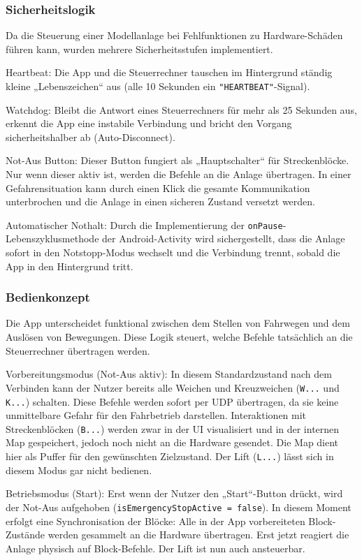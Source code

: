 \documentclass{article}
\begin{document}
\subsubsection{Sicherheitslogik}
Da die Steuerung einer Modellanlage bei Fehlfunktionen zu Hardware-Schäden führen kann, wurden mehrere Sicherheitsstufen implementiert.

Heartbeat: Die App und die Steuerrechner tauschen im Hintergrund ständig kleine „Lebenszeichen“ aus (alle 10 Sekunden ein \texttt{"HEARTBEAT"}-Signal).

Watchdog: Bleibt die Antwort eines Steuerrechners für mehr als 25 Sekunden aus, erkennt die App eine instabile Verbindung und bricht den Vorgang sicherheitshalber ab (Auto-Disconnect).

Not-Aus Button: Dieser Button fungiert als „Hauptschalter“ für Streckenblöcke. Nur wenn dieser aktiv ist, werden die Befehle an die Anlage übertragen. In einer Gefahrensituation kann durch einen Klick die gesamte Kommunikation unterbrochen und die Anlage in einen sicheren Zustand versetzt werden. 

Automatischer Nothalt: Durch die Implementierung der \texttt{onPause}-Lebenszyklusmethode der Android-Activity wird sichergestellt, dass die Anlage sofort in den Notstopp-Modus wechselt und die Verbindung trennt, sobald die App in den Hintergrund tritt.


\subsubsection{Bedienkonzept}
Die App unterscheidet funktional zwischen dem Stellen von Fahrwegen und dem Auslösen von Bewegungen. Diese Logik steuert, welche Befehle tatsächlich an die Steuerrechner übertragen werden.

Vorbereitungsmodus (Not-Aus aktiv): In diesem Standardzustand nach dem Verbinden kann der Nutzer bereits alle Weichen und Kreuzweichen (\texttt{W...} und \texttt{K...}) schalten. Diese Befehle werden sofort per UDP übertragen, da sie keine unmittelbare Gefahr für den Fahrbetrieb darstellen. Interaktionen mit Streckenblöcken (\texttt{B...}) werden zwar in der UI visualisiert und in der internen Map gespeichert, jedoch noch nicht an die Hardware gesendet. Die Map dient hier als Puffer für den gewünschten Zielzustand. Der Lift (\texttt{L...}) lässt sich in diesem Modus gar nicht bedienen.

Betriebsmodus (Start): Erst wenn der Nutzer den „Start“-Button drückt, wird der Not-Aus aufgehoben (\texttt{isEmergencyStopActive = false}). In diesem Moment erfolgt eine Synchronisation der Blöcke: Alle in der App vorbereiteten Block-Zustände werden gesammelt an die Hardware übertragen. Erst jetzt reagiert die Anlage physisch auf Block-Befehle. Der Lift ist nun auch ansteuerbar.
\end{document}
